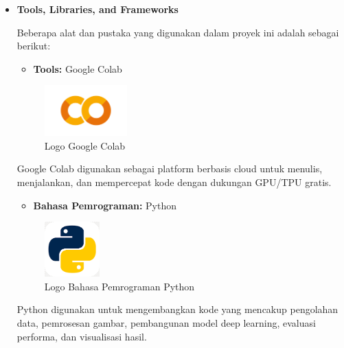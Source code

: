 \documentclass[12pt,a4paper]{article}
\begin{document}
\begin{itemize}
 \item \textbf{Tools, Libraries, and Frameworks}
 
Beberapa alat dan pustaka yang digunakan dalam proyek ini adalah sebagai berikut:

\begin{itemize}
    \item \textbf{Tools:} Google Colab
\end{itemize}
\begin{figure}[h]
    \centering
    \includegraphics[width=0.3\textwidth]{Image/colabPng.png}
    \caption{Logo Google Colab}
    \label{fig:Logo_google_colab}
\end{figure}
\hspace{0.5cm} Google Colab digunakan sebagai platform berbasis cloud untuk menulis, menjalankan, dan mempercepat kode dengan dukungan GPU/TPU gratis.


\begin{itemize}
    \item \textbf{Bahasa Pemrograman:} Python
\end{itemize}
\begin{figure}[h]
    \centering
    \includegraphics[width=0.2\textwidth]{Image/pythonpng.png}
    \caption{Logo Bahasa Pemrograman Python}
    \label{fig:Logo_python}
\end{figure}
\hspace{0.5cm} Python digunakan untuk mengembangkan kode yang mencakup pengolahan data, pemrosesan gambar, pembangunan model deep learning, evaluasi performa, dan visualisasi hasil.


\end{itemize}
\end{document}
